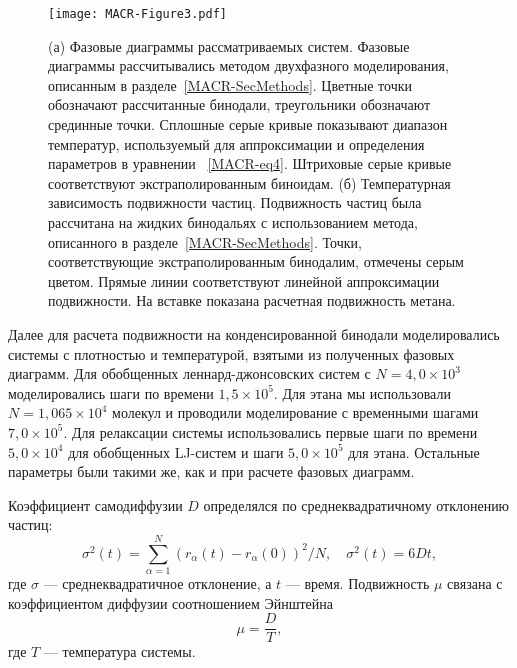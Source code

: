 \begin{figure}[!t]
\centering
 \texttt{[image: MACR-Figure3.pdf]}
 \caption{(а) Фазовые диаграммы рассматриваемых систем. Фазовые диаграммы рассчитывались методом двухфазного моделирования, описанным в разделе~\ref{MACR-SecMethods}. Цветные точки обозначают рассчитанные бинодали, треугольники обозначают срединные точки. Сплошные серые кривые показывают диапазон температур, используемый для аппроксимации и определения параметров в уравнении ~\eqref{MACR-eq4}. Штриховые серые кривые соответствуют экстраполированным биноидам. (б) Температурная зависимость подвижности частиц. Подвижность частиц была рассчитана на жидких бинодальях с использованием метода, описанного в разделе~\ref{MACR-SecMethods}. Точки, соответствующие экстраполированным бинодалим, отмечены серым цветом. Прямые линии соответствуют линейной аппроксимации подвижности. На вставке показана расчетная подвижность метана.}
\label{MACR-Figure3}
\end{figure}

Далее для расчета подвижности на конденсированной бинодали моделировались системы с плотностью и температурой, взятыми из полученных фазовых диаграмм.
Для обобщенных леннард-джонсовских систем с $N = 4,0 \times 10 ^ 3$ моделировались шаги по времени $1,5 \times 10 ^ 5$. Для этана мы использовали $N = 1,065 \times 10 ^ 4 $ молекул и проводили моделирование с временными шагами $ 7,0 \times 10 ^ 5 $. Для релаксации системы использовались первые шаги по времени $ 5,0 \times 10 ^ 4 $ для обобщенных LJ-систем и шаги $ 5,0 \times 10 ^ 5 $ для этана. Остальные параметры были такими же, как и при расчете фазовых диаграмм.

Коэффициент самодиффузии $D$ определялся по среднеквадратичному отклонению частиц:
\begin{equation}
    \sigma^2(t) = \sum\limits_{\alpha = 1}^{N} (r_{\alpha}(t) - r_{\alpha}(0))^2 / N, \quad \sigma^2(t) = 6Dt,
    \label{MACR-eq5}
\end{equation}
где $\sigma$ — среднеквадратичное отклонение, а $t$ — время. Подвижность $\mu$ связана с коэффициентом диффузии соотношением Эйнштейна
\begin{equation}
    \mu = \frac{D}{T},
    \label{MACR-eq6}
\end{equation}
где $T$ — температура системы.

